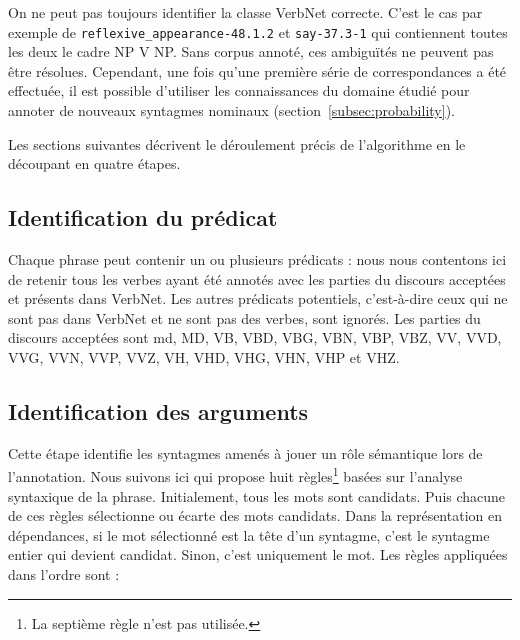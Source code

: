 On ne peut pas toujours identifier la classe VerbNet correcte. C'est le cas par
exemple de \texttt{reflexive\_appearance-48.1.2} et \texttt{say-37.3-1} qui
contiennent toutes les deux le cadre NP V NP. Sans corpus annoté, ces
ambiguïtés ne peuvent pas être résolues.  Cependant, une fois qu'une première
série de correspondances a été effectuée, il est possible d'utiliser les
connaissances du domaine étudié pour annoter de nouveaux syntagmes nominaux
(section~\ref{subsec:probability}).

Les sections suivantes décrivent le déroulement précis de l'algorithme en le
découpant en quatre étapes.

\subsection{Identification du prédicat}

Chaque phrase peut contenir un ou plusieurs prédicats : nous nous contentons
ici de retenir tous les verbes ayant été annotés avec les parties du discours
acceptées et présents dans VerbNet. Les autres prédicats potentiels,
c'est-à-dire ceux qui ne sont pas dans VerbNet et ne sont pas des verbes, sont
ignorés. Les parties du discours acceptées sont md, MD, VB, VBD, VBG, VBN, VBP,
VBZ, VV, VVD, VVG, VVN, VVP, VVZ, VH, VHD, VHG, VHN, VHP et VHZ.

\subsection{Identification des arguments}

Cette étape identifie les syntagmes amenés à jouer un rôle sémantique lors de
l'annotation. Nous suivons ici \cite{lang2011unsupervised} qui propose huit
règles\footnote{La septième règle n'est pas utilisée.} basées sur l'analyse
syntaxique de la phrase. Initialement, tous les mots sont candidats. Puis
chacune de ces règles sélectionne ou écarte des mots candidats. Dans la
représentation en dépendances, si le mot sélectionné est la tête d'un syntagme,
c'est le syntagme entier qui devient candidat. Sinon, c'est uniquement le mot.
Les règles appliquées dans l'ordre sont :

